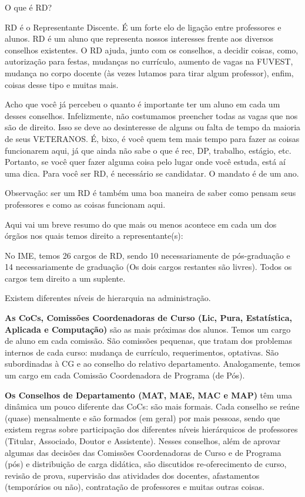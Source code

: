 \begin{secao}{O que é RD?}

RD é o Representante Discente. É um forte elo de ligação entre professores e
alunos. RD é um aluno que representa nossos interesses frente aos diversos
conselhos existentes. O RD ajuda, junto com os conselhos, a decidir coisas, como,
autorização para festas, mudanças no currículo, aumento de vagas na FUVEST,
mudança no corpo docente (às vezes lutamos para tirar algum professor), enfim,
coisas desse tipo e muitas mais.

Acho que você já percebeu o quanto é importante ter um aluno em cada um desses
conselhos. Infelizmente, não costumamos preencher todas as vagas que nos são de
direito. Isso se deve ao desinteresse de alguns ou falta de tempo da maioria
de seus VETERANOS. É, bixo, é você quem tem mais tempo para fazer as coisas
funcionarem aqui, já que ainda não sabe o que é rec, DP, trabalho, estágio, etc.
Portanto, se você quer fazer alguma coisa pelo lugar onde você estuda, está aí
uma dica. Para você ser RD, é necessário se candidatar. O mandato é de um
ano.

Observação: ser um RD é também uma boa maneira de saber como pensam seus 
professores e como as coisas funcionam aqui.

Aqui vai um breve resumo do que mais
ou menos acontece em cada um dos órgãos nos quais temos direito a
representante(s):

No IME, temos 26 cargos de RD, sendo 10 necessariamente de pós-graduação e 14
necessariamente de graduação (Os dois cargos restantes são livres). Todos os
cargos tem direito a um suplente.

Existem diferentes níveis de hierarquia na administração.

{\bf As CoCs,
Comissões Coordenadoras de Curso (Lic, Pura, Estatística, Aplicada e
Computação)} são as mais próximas dos alunos. Temos um cargo de aluno em cada
comissão. São comissões pequenas, que tratam dos problemas internos de cada
curso: mudança de currículo, requerimentos, optativas. São subordinadas à CG e ao
conselho do relativo departamento. Analogamente, temos um cargo em cada
Comissão Coordenadora de Programa (de Pós).

{\bf Os Conselhos de Departamento (MAT, MAE, MAC e MAP)} têm uma dinâmica um
pouco diferente das CoCs: são mais formais. Cada conselho se reúne (quase)
mensalmente e são formados (em geral) por mais pessoas, sendo que existem
regras sobre participação dos diferentes níveis hierárquicos de
professores (Titular, Associado, Doutor e Assistente). Nesses conselhos, além
de aprovar algumas das decisões das Comissões Coordenadoras de Curso e de
Programa (pós) e distribuição de carga didática, são discutidos re-oferecimento
de curso, revisão de prova, supervisão das atividades dos docentes,
afastamentos (temporários ou não), contratação de professores e muitas outras
coisas.


\end{secao}
